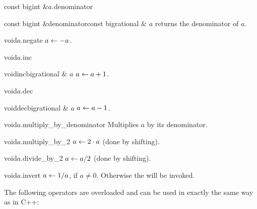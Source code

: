 \begin{cfcode}{const bigint &}{$a$.denominator}{}\end{cfcode}
\begin{fcode}{const bigint &}{denominator}{const bigrational & $a$}
  returns the denominator of $a$.
\end{fcode}



\MODF

\begin{fcode}{void}{$a$.negate}{}
  $a \leftarrow -a$.
\end{fcode}

\begin{fcode}{void}{$a$.inc}{}\end{fcode}
\begin{fcode}{void}{inc}{bigrational & $a$}
  $a \leftarrow a + 1$.
\end{fcode}

\begin{fcode}{void}{$a$.dec}{}\end{fcode}
\begin{fcode}{void}{dec}{bigrational & $a$}
  $a \leftarrow a - 1$.
\end{fcode}

\begin{fcode}{void}{$a$.multiply_by_denominator}{}
  Multiplies $a$ by its denominator.
\end{fcode}

\begin{fcode}{void}{$a$.multiply_by_2}{}
  $a \leftarrow 2 \cdot a$ (done by shifting).
\end{fcode}

\begin{fcode}{void}{$a$.divide_by_2}{}
  $a \leftarrow a / 2$ (done by shifting).
\end{fcode}

\begin{fcode}{void}{$a$.invert}{}
  $a \leftarrow 1 / a$, if $a \neq 0$.  Otherwise the \LEH will be invoked.
\end{fcode}



\ARTH

The following operators are overloaded and can be used in exactly the same way as in C++:

\begin{center}
  \\
  \\
\end{center}

